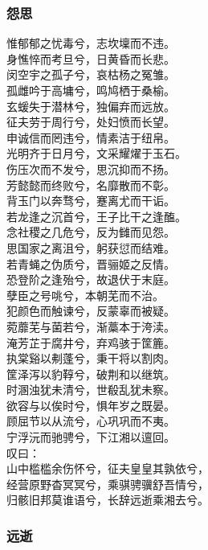 \documentclass[]{article}
\begin{document}
\hypertarget{header-n3092}{%
\subsubsection{怨思}\label{header-n3092}}

惟郁郁之忧毒兮，志坎壈而不违。\\
身憔悴而考旦兮，日黄昏而长悲。\\
闵空宇之孤子兮，哀枯杨之冤雏。\\
孤雌吟于高墉兮，鸣鸠栖于桑榆。\\
玄蝯失于潜林兮，独偏弃而远放。\\
征夫劳于周行兮，处妇愤而长望。\\
申诚信而罔违兮，情素洁于纽帛。\\
光明齐于日月兮，文采耀燿于玉石。\\
伤压次而不发兮，思沉抑而不扬。\\
芳懿懿而终败兮，名靡散而不彰。\\
背玉门以奔骛兮，蹇离尤而干诟。\\
若龙逢之沉首兮，王子比干之逢醢。\\
念社稷之几危兮，反为雠而见怨。\\
思国家之离沮兮，躬获愆而结难。\\
若青蝇之伪质兮，晋骊姬之反情。\\
恐登阶之逢殆兮，故退伏于末庭。\\
孽臣之号咷兮，本朝芜而不治。\\
犯颜色而触谏兮，反蒙辜而被疑。\\
菀蘼芜与菌若兮，渐藁本于洿渎。\\
淹芳芷于腐井兮，弃鸡骇于筐簏。\\
执棠谿以刜蓬兮，秉干将以割肉。\\
筐泽泻以豹鞟兮，破荆和以继筑。\\
时溷浊犹未清兮，世殽乱犹未察。\\
欲容与以俟时兮，惧年岁之既晏。\\
顾屈节以从流兮，心巩巩而不夷。\\
宁浮沅而驰骋兮，下江湘以邅回。\\
叹曰：\\
山中槛槛余伤怀兮，征夫皇皇其孰依兮，\\
经营原野杳冥冥兮，乘骐骋骥舒吾情兮，\\
归骸旧邦莫谁语兮，长辞远逝乘湘去兮。

\hypertarget{header-n3097}{%
\subsubsection{远逝}\label{header-n3097}}
\end{document}

